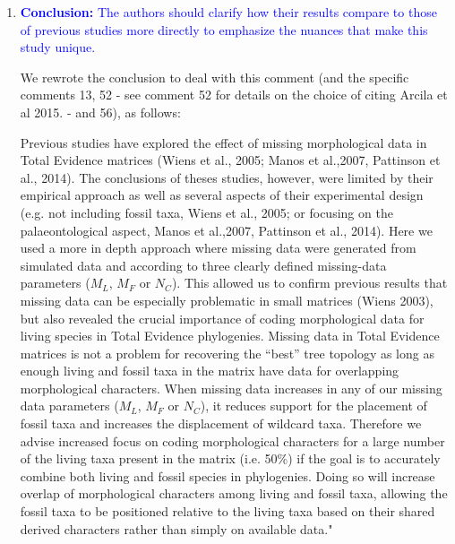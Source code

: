 \documentclass[12pt,letterpaper]{article}
\begin{document}
\begin{enumerate}
\item{\textcolor{blue}{\textbf{Conclusion:} The authors should clarify how their results compare to those of previous studies more directly to emphasize the nuances that make this study unique. }}

We rewrote the conclusion to deal with this comment (and the specific comments 13, 52 - see comment 52 for details on the choice of citing Arcila et al 2015. - and 56), as follows:

Previous studies have explored the effect of missing morphological data in Total Evidence matrices (Wiens et al., 2005; Manos et al.,2007, Pattinson et al., 2014).
The conclusions of theses studies, however, were limited by their empirical approach as well as several aspects of their experimental design (e.g. not including fossil taxa, Wiens et al., 2005; or focusing on the palaeontological aspect, Manos et al.,2007, Pattinson et al., 2014).
Here we used a more in depth approach where missing data were generated from simulated data and according to three clearly defined missing-data parameters ($M_{L}$, $M_{F}$ or $N_{C}$).
This allowed us to confirm previous results that missing data can be especially problematic in small matrices (Wiens 2003), but also revealed the crucial importance of coding morphological data for living species in Total Evidence phylogenies.
Missing data in Total Evidence matrices is not a problem for recovering the ``best'' tree topology as long as enough living and fossil taxa in the matrix have data for overlapping morphological characters.
When missing data increases in any of our missing data parameters ($M_{L}$, $M_{F}$ or $N_{C}$), it reduces support for the placement of fossil taxa and increases the displacement of wildcard taxa.
Therefore we advise increased focus on coding morphological characters for a large number of the living taxa present in the matrix (i.e. 50\%) if the goal is to accurately combine both living and fossil species in phylogenies.
Doing so will increase overlap of morphological characters among living and fossil taxa, allowing the fossil taxa to be positioned relative to the living taxa based on their shared derived characters rather than simply on available data."


\end{enumerate}
\end{document}
